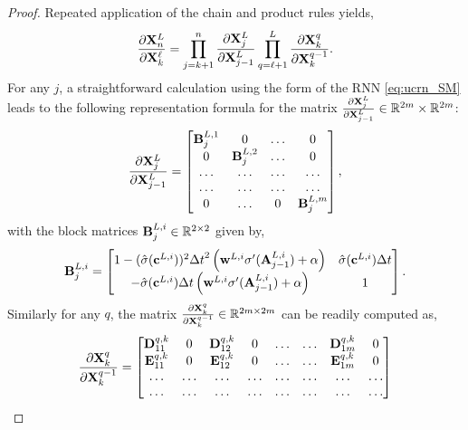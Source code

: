 \documentclass{article}
\newcommand{\bX}{{\bf X}}
\newcommand{\bB}{{\bf B}}
\newcommand{\R}{{\mathbb R}}
\newcommand{\Dt}{{\Delta t}}
\newcommand{\cLi}{\hat{\sigma}({\bf c}^{L,i})}
\newcommand{\ALi}{{\bf A}^{L,i}}
\newcommand{\bwLi}{{\bf w}^{L,i}}
\newcommand{\bD}{{\bf D}}
\newcommand{\bE}{{\bf E}}
\begin{document}
\begin{proof}
Repeated application of the chain and product rules yields,
\begin{equation}
\label{eq:grad3}
 \frac{\partial \bX^L_n}{\partial \bX^\ell_k} = \prod\limits_{j=k+1}^n  \frac{\partial \bX^L_j}{\partial \bX^L_{j-1}} \prod\limits_{q=\ell+1}^L  \frac{\partial \bX^q_k}{\partial \bX^{q-1}_{k}}. 
\end{equation}
For any $j$, a straightforward calculation using the form of the RNN \eqref{eq:ucrn_SM} leads to the following representation formula for the matrix $\frac{\partial \bX^L_j}{\partial \bX^L_{j-1}} \in \R^{2m} \times \R^{2m}$:
\begin{equation}
    \label{eq:mat1}
    \frac{\partial \bX^L_j}{\partial \bX^L_{j-1}}= \begin{bmatrix}
    \bB^{L,1}_{j} &0 &\ldots &0 \\
    0&  \bB^{L,2}_{j} &\ldots &0 \\
    \ldots & \ldots & \ldots & \ldots \\
     \ldots & \ldots & \ldots & \ldots \\
     0 &\ldots & 0 &  \bB^{L,m}_{j}
    \end{bmatrix},
\end{equation}
with the block matrices $\bB^{L,i}_j \in \R^{2 \times 2}$ given by,
\begin{equation}
    \label{eq:mat2}
    \bB^{L,i}_j  = \begin{bmatrix}
    1 - (\cLi)^2 \Dt^2 \left(\bwLi \sigma^{\prime}(\ALi_{j-1})+\alpha\right) & \cLi \Dt \\
    -\cLi \Dt \left(\bwLi \sigma^{\prime}(\ALi_{j-1})+\alpha\right) & 1 
    \end{bmatrix}.
\end{equation}
Similarly for any $q$, the matrix  $\frac{\partial \bX^q_k}{\partial \bX^{q-1}_{k}} \in \R^{2m \times 2m}$ can be readily computed as,
\begin{equation}
    \label{eq:mat3}
     \frac{\partial \bX^q_k}{\partial \bX^{q-1}_{k}} = \begin{bmatrix}
     \bD^{q,k}_{11} & 0 & \bD^{q,k}_{12} & 0 &\ldots &\ldots &\bD^{q,k}_{1m} & 0 \\
     \bE^{q,k}_{11} & 0 & \bE^{q,k}_{12} & 0 &\ldots &\ldots &\bE^{q,k}_{1m} & 0 \\
     \ldots & \ldots & \ldots & \ldots & \ldots & \ldots & \ldots & \ldots \\
      \ldots & \ldots & \ldots & \ldots & \ldots & \ldots & \ldots & \ldots \\

\end{bmatrix}
\end{equation}
\end{proof}
\end{document}
